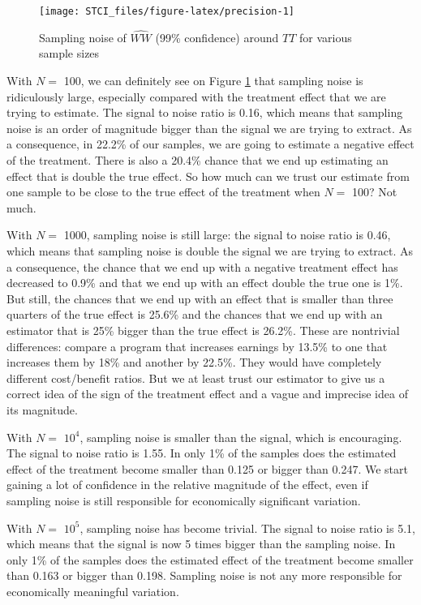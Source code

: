 \documentclass[]{book}
\theoremstyle{definition}
\theoremstyle{definition}
\theoremstyle{definition}
\theoremstyle{remark}
\begin{document}
\begin{figure}[htbp]

{\centering \texttt{[image: STCI\_files/figure-latex/precision-1]} 

}

\caption{Sampling noise of $\hat{WW}$ (99\% confidence) around $TT$ for various sample sizes}\label{fig:precision}
\end{figure}

With \(N=\) 100, we can definitely see on Figure \ref{fig:precision} that sampling noise is ridiculously large, especially compared with the treatment effect that we are trying to estimate.
The signal to noise ratio is 0.16, which means that sampling noise is an order of magnitude bigger than the signal we are trying to extract.
As a consequence, in 22.2\% of our samples, we are going to estimate a negative effect of the treatment.
There is also a 20.4\% chance that we end up estimating an effect that is double the true effect.
So how much can we trust our estimate from one sample to be close to the true effect of the treatment when \(N=\) 100?
Not much.

With \(N=\) 1000, sampling noise is still large: the signal to noise ratio is 0.46, which means that sampling noise is double the signal we are trying to extract.
As a consequence, the chance that we end up with a negative treatment effect has decreased to 0.9\% and that we end up with an effect double the true one is 1\%.
But still, the chances that we end up with an effect that is smaller than three quarters of the true effect is 25.6\% and the chances that we end up with an estimator that is 25\% bigger than the true effect is 26.2\%.
These are nontrivial differences: compare a program that increases earnings by 13.5\% to one that increases them by 18\% and another by 22.5\%.
They would have completely different cost/benefit ratios.
But we at least trust our estimator to give us a correct idea of the sign of the treatment effect and a vague and imprecise idea of its magnitude.

With \(N=\) \ensuremath{10^{4}}, sampling noise is smaller than the signal, which is encouraging.
The signal to noise ratio is 1.55.
In only 1\% of the samples does the estimated effect of the treatment become smaller than 0.125 or bigger than 0.247.
We start gaining a lot of confidence in the relative magnitude of the effect, even if sampling noise is still responsible for economically significant variation.

With \(N=\) \ensuremath{10^{5}}, sampling noise has become trivial.
The signal to noise ratio is 5.1, which means that the signal is now 5 times bigger than the sampling noise.
In only 1\% of the samples does the estimated effect of the treatment become smaller than 0.163 or bigger than 0.198.
Sampling noise is not any more responsible for economically meaningful variation.
\end{document}
